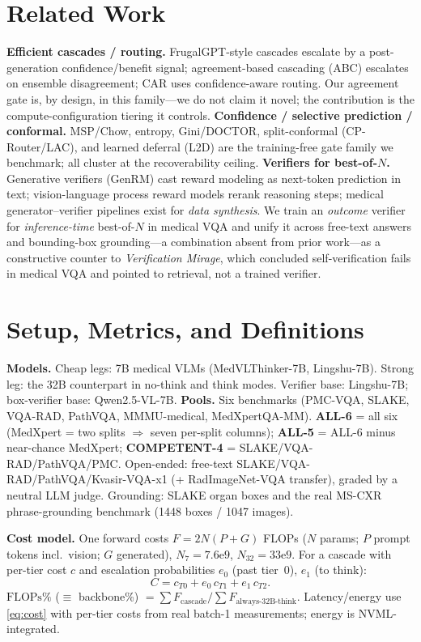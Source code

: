 \documentclass[conference]{IEEEtran}
\begin{document}
\section{Related Work}
\textbf{Efficient cascades / routing.} FrugalGPT-style cascades escalate by a post-generation confidence/benefit signal; agreement-based cascading (ABC) escalates on ensemble disagreement; CAR uses confidence-aware routing. Our agreement gate is, by design, in this family---we do not claim it novel; the contribution is the compute-configuration tiering it controls. \textbf{Confidence / selective prediction / conformal.} MSP/Chow, entropy, Gini/DOCTOR, split-conformal (CP-Router/LAC), and learned deferral (L2D) are the training-free gate family we benchmark; all cluster at the recoverability ceiling. \textbf{Verifiers for best-of-$N$.} Generative verifiers (GenRM) cast reward modeling as next-token prediction in text; vision-language process reward models rerank reasoning steps; medical generator--verifier pipelines exist for \emph{data synthesis}. We train an \emph{outcome} verifier for \emph{inference-time} best-of-$N$ in medical VQA and unify it across free-text answers and bounding-box grounding---a combination absent from prior work---as a constructive counter to \emph{Verification Mirage}, which concluded self-verification fails in medical VQA and pointed to retrieval, not a trained verifier.

\section{Setup, Metrics, and Definitions}
\textbf{Models.} Cheap legs: 7B medical VLMs (MedVLThinker-7B, Lingshu-7B). Strong leg: the 32B counterpart in no-think and think modes. Verifier base: Lingshu-7B; box-verifier base: Qwen2.5-VL-7B. \textbf{Pools.} Six benchmarks (PMC-VQA, SLAKE, VQA-RAD, PathVQA, MMMU-medical, MedXpertQA-MM). \textbf{ALL-6} = all six (MedXpert = two splits $\Rightarrow$ seven per-split columns); \textbf{ALL-5} = ALL-6 minus near-chance MedXpert; \textbf{COMPETENT-4} = SLAKE/VQA-RAD/PathVQA/PMC. Open-ended: free-text SLAKE/VQA-RAD/PathVQA/Kvasir-VQA-x1 (+ RadImageNet-VQA transfer), graded by a neutral LLM judge. Grounding: SLAKE organ boxes and the real MS-CXR phrase-grounding benchmark (1448 boxes / 1047 images).

\textbf{Cost model.} One forward costs $F=2N(P{+}G)$ FLOPs ($N$ params; $P$ prompt tokens incl.\ vision; $G$ generated), $N_7{=}7.6\mathrm{e}9$, $N_{32}{=}33\mathrm{e}9$. For a cascade with per-tier cost $c$ and escalation probabilities $e_0$ (past tier~0), $e_1$ (to think):
\begin{equation}
C = c_{T0} + e_0\,c_{T1} + e_1\,c_{T2}. \label{eq:cost}
\end{equation}
$\mathrm{FLOPs\%}$ (${\equiv}$ backbone\%) $= \sum F_{\text{cascade}} / \sum F_{\text{always-32B-think}}$. Latency/energy use \eqref{eq:cost} with per-tier costs from real batch-1 measurements; energy is NVML-integrated.
\end{document}
